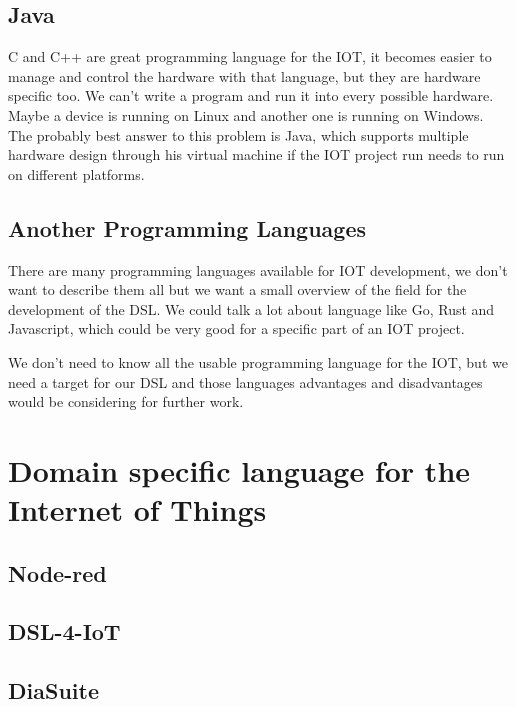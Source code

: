 \subsection{Java}
\label{subsec:java}

C and C++ are great programming language for the IOT, it becomes easier to manage
and control the hardware with that language, but they are hardware specific
too. We can’t write a program and run it into every possible hardware. Maybe a
device is running on Linux and another one is running on Windows. The probably
best answer to this problem is Java\cite{Waher:2015:LIT:2789499}, which supports
multiple hardware design through his virtual machine if the IOT project run
needs to run on different platforms.

\subsection{Another Programming Languages}
\label{subsec:other-prog-lang}

There are many programming languages available for IOT development, we don’t want
to describe them all but we want a small overview of the field for the
development of the DSL. We could talk a lot about language like Go, Rust and
Javascript, which could be very good for a specific part of an IOT project.

We don’t need to know all the usable programming language for the IOT, but we
need a target for our DSL and those languages advantages and disadvantages
would be considering for further work.

\section{Domain specific language for the Internet of Things}
\label{sec:dsl-for-iot}

\subsection{Node-red}
\label{subsec:node-red}

\subsection{DSL-4-IoT}
\label{subsec:dsl-4-iot}

\subsection{DiaSuite}
\label{subsec:diasuite}

